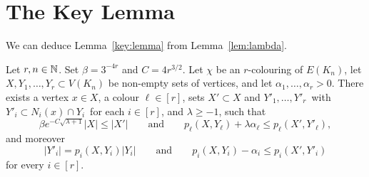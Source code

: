 
\section{The Key Lemma}


We can deduce Lemma~\ref{key:lemma} from Lemma~\ref{lem:lambda}.

\begin{lemma}
  \label{lem:key-lemma} %
  Let \(r, n\in\mathbb{N}\). Set \(\beta = 3^{-4r}\) and \(C = 4r^{3/2}\).
  Let \(\chi\) be an \(r\)-colouring of \(E(K_n)\), let \(X,Y_1,\ldots,Y_r \subset V(K_n)\) be non-empty sets of vertices, and let \(\alpha_1,\ldots,\alpha_r > 0\). There exists a vertex \(x \in X\), a colour \(\ell \in [r]\), sets \(X' \subset X\) and \(Y'_1,\ldots,Y'_r\,\) with \(Y'_i \subset N_i(x) \cap Y_i\,\) for each \(i \in [r]\), and \(\lambda \ge -1\), such that
  \begin{equation}\label{eq:key:ell}
    \beta e^{- C \sqrt{\lambda + 1}} |X| \le |X'| \qquad \text{and} \qquad p_\ell(X,Y_\ell) + \lambda \alpha_\ell \le p_\ell( X', Y'_\ell ) ,
  \end{equation}
  and moreover
  \begin{equation}\label{eq:key:alli}
    |Y'_i| = p_i(X,Y_i) |Y_i| \qquad \text{and} \qquad  p_i(X,Y_i) - \alpha_i \le p_i( X', Y'_i )
  \end{equation}
  for every \(i \in [r]\).
\end{lemma}
%
